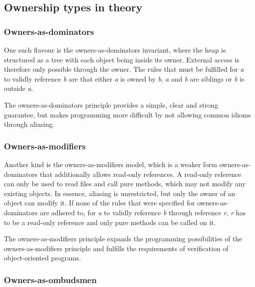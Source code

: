 \documentclass[sigplan,11pt,nonacm]{acmart}
\begin{document}
\subsection{Ownership types in theory}



\subsubsection{Owners-as-dominators}

One such flavour is the owners-as-dominators\cite{ownership-types-survey} invariant, where the heap is structured as a tree with each object being inside its owner.
External access is therefore only possible through the owner.
The rules that must be fulfilled for \emph{a} to validly reference \emph{b} are that either \emph{a} is owned by \emph{b}, \emph{a} and \emph{b} are siblings or \emph{b} is outside \emph{a}.

The owners-as-dominators principle provides a simple, clear and strong guarantee, but makes programming more difficult by not allowing common idioms through aliasing.
\cite{ownership-types-survey}


\subsubsection{Owners-as-modifiers}

Another kind is the owners-as-modifiers model, which is a weaker form owners-as-dominators that additionally allows read-only references.
A read-only reference can only be used to read files and call pure methods, which may not modify any existing objects.
In essence, aliasing is unrestricted, but only the owner of an object can modify it.
If none of the rules that were specified for owners-as-dominators are adhered to, for \emph{a} to validly reference \emph{b} through reference \emph{r}, \emph{r} has to be a read-only reference and only pure methods can be called on it.

The owners-as-modifiers principle expands the programming possibilities of the owners-as-modifiers principle and fulfills the requirements of verification of object-oriented programs.

\cite{ownership-types-survey}


\subsubsection{Owners-as-ombudsmen}
\end{document}
